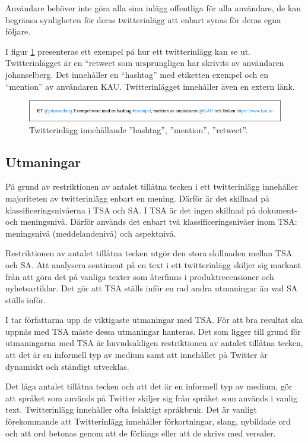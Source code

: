 \documentclass{kaumasters} %
\begin{document}
Användare behöver inte göra alla sina inlägg offentliga för alla användare, de kan begränsa synligheten för deras twitterinlägg att enbart synas för deras egna följare. 

I figur \ref{fig:tweet} presenteras ett exempel på hur ett twitterinlägg kan se ut. Twitterinlägget är en “retweet som ursprungligen har skrivits av användaren johanselberg. Det innehåller en “hashtag” med etiketten exempel och en “mention” av användaren KAU. Twitterinlägget innehåller även en extern länk.

\begin{figure}[h]
\includegraphics[width=12cm]{exempeltweet}
\centering
\caption{Twitterinlägg innehållande ''hashtag'', ''mention'', ''retweet''.}
\label{fig:tweet}
\end{figure}

\subsection{Utmaningar} \label{TSAchall}
På grund av restriktionen av antalet tillåtna tecken i ett twitterinlägg innehåller majoriteten av twitterinlägg enbart en mening. Därför är det skillnad på klassificeringsnivåerna i TSA och SA. I TSA är det ingen skillnad på dokument- och meningsnivå. Därför används det enbart två klassificeringsnivåer inom TSA: meningsnivå (meddelandenivå) och aspektnivå. \cite{TSAsurvey}

Restriktionen av antalet tillåtna tecken utgör den stora skillnaden mellan TSA och SA. Att analysera sentiment på en text i ett twitterinlägg skiljer sig markant från att göra det på vanliga texter som återfinns i produktrecensioner och nyhetsartiklar. Det gör att TSA ställs inför en rad andra utmaningar än vad SA ställs inför.

I \cite{TSAsurvey} tar författarna upp de viktigaste utmaningar med TSA. För att bra resultat ska uppnås med TSA måste dessa utmaningar hanteras. Det som ligger till grund för utmaningarna med TSA är huvudsakligen restriktionen av antalet tillåtna tecken, att det är en informell typ av medium samt att innehållet på Twitter är dynamiskt och ständigt utvecklas.

Det låga antalet tillåtna tecken och att det är en informell typ av medium, gör att språket som används på Twitter skiljer sig från språket som används i vanlig text. Twitterinlägg innehåller ofta felaktigt språkbruk. Det är vanligt förekommande att Twitterinlägg innehåller förkortningar, slang, nybildade ord och att ord betonas genom att de förlängs eller att de skrivs med versaler. 
\end{document}
